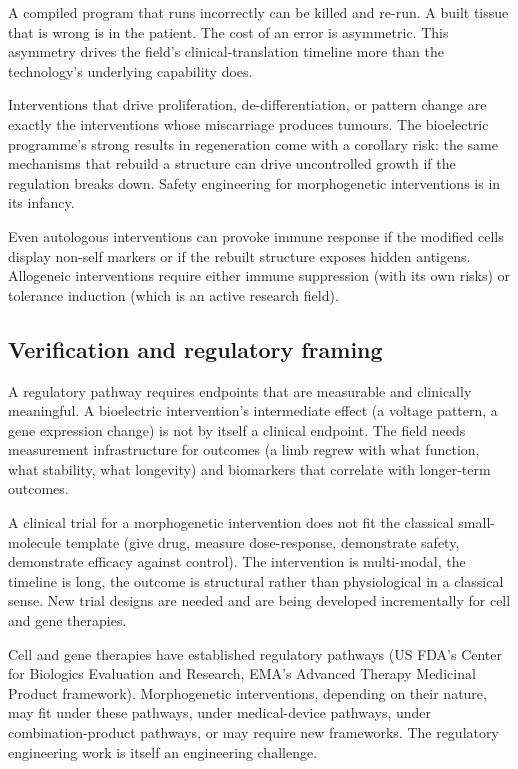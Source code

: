  A compiled program that runs
incorrectly can be killed and re-run. A built tissue that is wrong is
in the patient. The cost of an error is asymmetric. This asymmetry
drives the field's clinical-translation timeline more than the
technology's underlying capability does.

 Interventions that drive proliferation,
de-differentiation, or pattern change are exactly the interventions
whose miscarriage produces tumours. The bioelectric programme's strong
results in regeneration come with a corollary risk: the same mechanisms
that rebuild a structure can drive uncontrolled growth if the
regulation breaks down. Safety engineering for morphogenetic
interventions is in its infancy.

 Even autologous interventions can provoke
immune response if the modified cells display non-self markers or if
the rebuilt structure exposes hidden antigens. Allogeneic interventions
require either immune suppression (with its own risks) or tolerance
induction (which is an active research field).

\subsection{Verification and regulatory framing}

 A regulatory pathway requires
endpoints that are measurable and clinically meaningful. A bioelectric
intervention's intermediate effect (a voltage pattern, a gene
expression change) is not by itself a clinical endpoint. The field
needs measurement infrastructure for outcomes (a limb regrew with what
function, what stability, what longevity) and biomarkers that correlate
with longer-term outcomes.

 A clinical trial for a morphogenetic
intervention does not fit the classical small-molecule template (give
drug, measure dose-response, demonstrate safety, demonstrate efficacy
against control). The intervention is multi-modal, the timeline is
long, the outcome is structural rather than physiological in a
classical sense. New trial designs are needed and are being developed
incrementally for cell and gene therapies.

 Cell and gene therapies have established
regulatory pathways (US FDA's Center for Biologics Evaluation and
Research, EMA's Advanced Therapy Medicinal Product framework).
Morphogenetic interventions, depending on their nature, may fit under
these pathways, under medical-device pathways, under combination-product
pathways, or may require new frameworks. The regulatory engineering
work is itself an engineering challenge.

